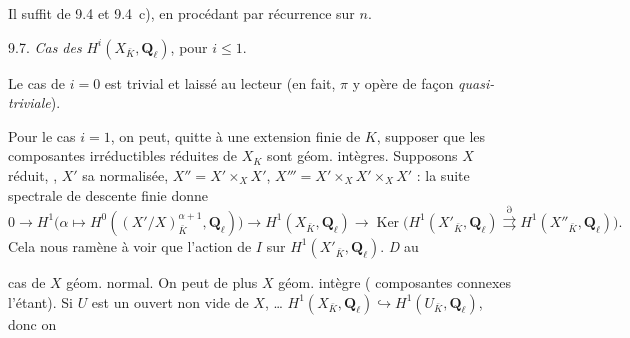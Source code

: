 \documentclass[11pt,a4paper]{article}
\begin{document}
Il suffit de  \struck{\ill{}}  9.4 et 9.4~c), en procédant par récurrence sur $n$.

\struck{\ill{}} 9.7. \emph{Cas des} $H^i(X_{\bar K}, \mathbf{Q}_\ell)$, pour $i \leq 1$.

Le cas de $i = 0$ est trivial et laissé au lecteur (en fait, $\pi$ y opère de façon \emph{quasi-triviale}).

Pour le cas $i = 1$, on \struck{\ill{}} peut, quitte à une extension finie de $K$, supposer que les composantes irréductibles réduites de $X_K$ sont géom. intègres. Supposons $X$ réduit, \ill{} \ill{} \ill{} \ill{} \ill{} \ill{}, $X'$ sa normalisée, $X'' = X' \times_X X'$, $X''' = X' \times_X X' \times_X X'$  : \struck{\ill{} \ill{}} la suite spectrale de descente finie donne
\[
0 \to H^1\bigl(\alpha \mapsto H^0((X'/X)^{\alpha+1}_{\bar K}, \mathbf{Q}_\ell)\bigr) \to H^1(X_{\bar K}, \mathbf{Q}_\ell) \to \operatorname{Ker}\bigl(H^1(X'_{\bar K}, \mathbf{Q}_\ell) \overset{\partial}{\rightrightarrows} H^1(X''_{\bar K}, \mathbf{Q}_\ell)\bigr) .
\]
Cela nous ramène à voir que l'action de $I$ sur \struck{\ill{}} $H^1(X'_{\bar K}, \mathbf{Q}_\ell)$. \emph{D} \ill{} \ill{}  au

cas de $X$ géom. normal.  On peut  de plus $X$ géom. intègre (\struck{\ill{} \ill{} \ill{}}  composantes connexes l'étant). Si $U$ est un ouvert non vide de $X$, \ldots{} $H^1(X_{\bar K}, \mathbf{Q}_\ell) \hookrightarrow H^1(U_{\bar K}, \mathbf{Q}_\ell)$, donc on  \ill{}

\end{document}
